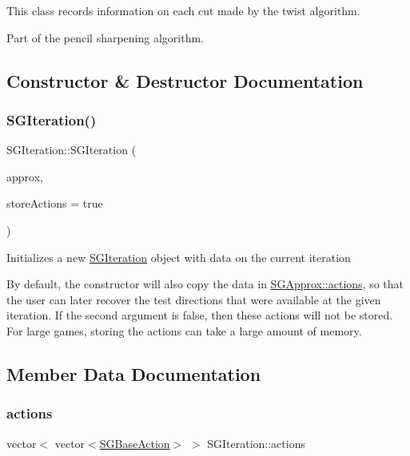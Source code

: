 This class records information on each cut made by the twist algorithm.

Part of the pencil sharpening algorithm. 

\subsection{Constructor \& Destructor Documentation}
\mbox{\label{classSGIteration_a4ac425cc85882c11443ef43601efd80b}} 
\subsubsection{\texorpdfstring{S\+G\+Iteration()}{SGIteration()}}
{\footnotesize\ttfamily S\+G\+Iteration\+::\+S\+G\+Iteration (\begin{DoxyParamCaption}\item[{const \hyperlink{classSGApprox}{S\+G\+Approx} \&}]{approx,  }\item[{bool}]{store\+Actions = {\ttfamily true} }\end{DoxyParamCaption})}

Initializes a new \hyperlink{classSGIteration}{S\+G\+Iteration} object with data on the current iteration

By default, the constructor will also copy the data in \hyperlink{classSGApprox_a0fccecf0f5dbe7e9288e47182f180879}{S\+G\+Approx\+::actions}, so that the user can later recover the test directions that were available at the given iteration. If the second argument is false, then these actions will not be stored. For large games, storing the actions can take a large amount of memory. 

\subsection{Member Data Documentation}
\mbox{\label{classSGIteration_a5b5fcd6440b8dbcc6a8ded9f81699337}} 
\subsubsection{\texorpdfstring{actions}{actions}}
{\footnotesize\ttfamily vector$<$ vector$<$\hyperlink{classSGBaseAction}{S\+G\+Base\+Action}$>$ $>$ S\+G\+Iteration\+::actions\hspace{0.3cm}{\ttfamily [private]}}

